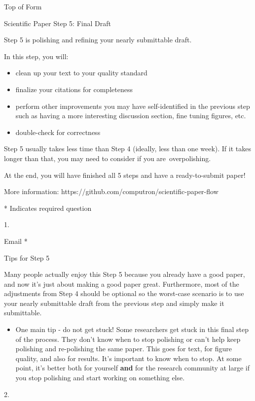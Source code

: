 \documentclass[]{article}
\date{}
\begin{document}
Top of Form

Scientific Paper Step 5: Final Draft

Step 5 is polishing and refining your nearly submittable draft.~

In this step, you will:

\begin{itemize}
\item
  clean up your text to your quality standard
\item
  finalize your citations for completeness
\item
  perform other improvements you may have self-identified in the
  previous step such as having a more interesting discussion section,
  fine tuning figures, etc.
\item
  double-check for correctness
\end{itemize}

Step 5 usually takes less time than Step 4 (ideally, less than one
week). If it takes longer than that, you may need to consider if you
are~overpolishing.

At the end, you will have finished all 5 steps and have a
ready-to-submit paper!

More information: https://github.com/computron/scientific-paper-flow

* Indicates required question

1.

Email *

Tips for Step 5

Many people actually enjoy this Step 5 because you already have a good
paper, and now it's just about making a good paper great. Furthermore,
most of the adjustments from Step 4 should be optional so the worst-case
scenario is to use your nearly submittable draft from the previous step
and simply make it submittable.

\begin{itemize}
\item
  One main tip - do not get stuck! Some researchers get stuck in this
  final step of the process. They don't know when to stop polishing or
  can't help keep polishing and re-polishing the same paper. This goes
  for text, for figure quality, and also for results. It's important to
  know when to stop. At some point, it's better both for yourself
  \textbf{and} for the research community at large if you stop polishing
  and start working on something else.
\end{itemize}

2.
\end{document}
